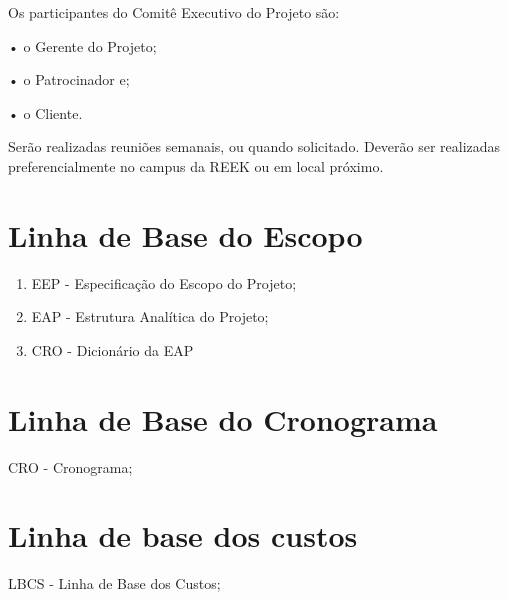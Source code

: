 \documentclass[12pt]{charter}
\begin{document}
Os participantes do Comitê Executivo do Projeto são:\newline

\indent • o Gerente do Projeto; \newline

\indent • o Patrocinador e; \newline

\indent • o Cliente.  \newline

\noindent Serão realizadas reuniões semanais, ou quando solicitado. Deverão ser realizadas preferencialmente no campus da REEK ou em local próximo.

\section*{Linha de Base do Escopo}
\label{sec:escopo}

\begin{enumerate}
   \item EEP - Especificação do Escopo do Projeto;
   
   \item EAP - Estrutura Analítica do Projeto;
   
   \item CRO - Dicionário da EAP
\end{enumerate}

\section*{Linha de Base do Cronograma}
\label{sec:cronograma}

CRO - Cronograma;

\section*{Linha de base dos custos}
\label{sec:titulo}

LBCS - Linha de Base dos Custos;\newline

\newline

\newline



\end{document}
